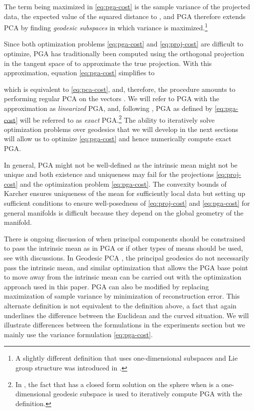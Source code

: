 \documentclass[final]{svjour3}
\begin{document}
The term being maximized in \eqref{eq:pga-cost} is the sample variance of the projected data, the expected value of the
squared distance to , and PGA therefore extends PCA by finding \emph{geodesic subspaces} in 
which variance is maximized.\footnote{
A slightly different definition that uses 
one-dimensional subspaces and Lie group structure was introduced
in \cite{fletcher_statistics_2003}.
}

Since both optimization problems \eqref{eq:pga-cost} and
\eqref{eq:proj-cost} are difficult to optimize, PGA has traditionally
been computed using the orthogonal projection in the tangent space of 
to approximate the true projection. With this approximation,
equation \eqref{eq:pga-cost} simplifies to

which is equivalent to \eqref{eq:pca-cost}, and, therefore,
the procedure amounts to performing regular PCA on the vectors .
We will refer to PGA with the approximation
as \emph{linearized} PGA, and, following \cite{said_exact_2007}, PGA as 
defined by \eqref{eq:pga-cost} will be referred to
as \emph{exact} PGA.\footnote{In \cite{said_exact_2007},
the fact that  has a closed form
solution on the sphere  when  is a one-dimensional geodesic subspace is used to 
iteratively compute
PGA with the \cite{fletcher_statistics_2003} definition.}
The ability to iteratively solve optimization problems over
geodesics that we will develop in the next sections will allow us to
optimize \eqref{eq:pga-cost} and hence numerically compute exact PGA.

In general, PGA might not be well-defined as the intrinsic mean might not be
unique and both existence and uniqueness may fail for the 
projections \eqref{eq:proj-cost} and the optimization problem \eqref{eq:pga-cost}. The convexity
bounds of Karcher \cite{karcher_riemannian_1977} ensures uniqueness of the mean
for sufficiently local data but setting up sufficient conditions to ensure
well-posedness of \eqref{eq:proj-cost} and \eqref{eq:pga-cost}
for general manifolds is difficult
because they depend on the global geometry of the manifold.

There is ongoing discussion of when principal components should be constrained to
pass the intrinsic mean as in PGA or if other types of means should be used, see 
\cite{huckemann_intrinsic_2010} with discussions. 
In Geodesic PCA \cite{huckemann_intrinsic_2010}, the principal geodesics do not necessarily pass the intrinsic
mean, and similar optimization that allows the PGA base point to move away from the
intrinsic mean can be carried
out with the optimization approach used in this paper.
PGA can also be modified by replacing maximization of sample variance by 
minimization of reconstruction error.
This alternate definition is not equivalent to the definition above, a fact that
again underlines the difference between the Euclidean and the curved
situation. We will illustrate differences between the formulations in the
experiments section but we mainly use the variance formulation \eqref{eq:pga-cost}.
\end{document}
